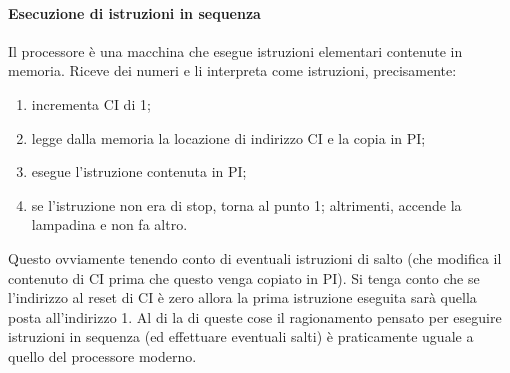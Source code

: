 \documentclass[11pt]{report}
\theoremstyle{definition}
\begin{document}
\paragraph{Esecuzione di istruzioni in sequenza} Il processore è una macchina che esegue istruzioni elementari contenute in memoria. Riceve dei numeri e li interpreta come istruzioni, precisamente:
\begin{enumerate}
\item incrementa CI di 1;
\item legge dalla memoria la locazione di indirizzo CI e la copia in PI;
\item esegue l'istruzione contenuta in PI;
\item se l'istruzione non era di stop, torna al punto 1; altrimenti, accende la lampadina e non fa altro.
\end{enumerate}
Questo ovviamente tenendo conto di eventuali istruzioni di salto (che modifica il contenuto di CI prima che questo venga copiato in PI). Si tenga conto che se l'indirizzo al reset di CI è zero allora la prima istruzione eseguita sarà quella posta all'indirizzo 1. Al di la di queste cose il ragionamento pensato per eseguire istruzioni in sequenza (ed effettuare eventuali salti) è praticamente uguale a quello del processore moderno.
\end{document}
